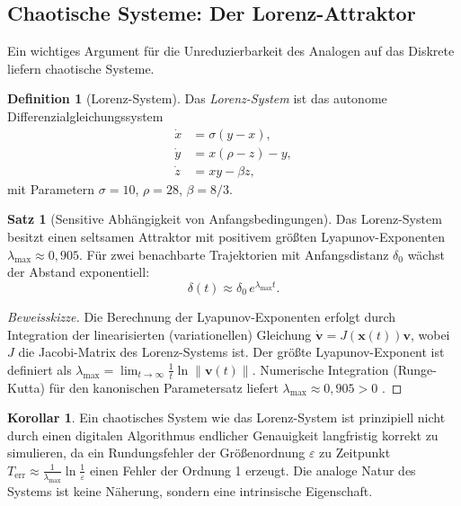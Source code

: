 ﻿\documentclass[a4paper,12pt]{article}
\theoremstyle{definition}
\newtheorem{definition}{Definition}
\newtheorem{satz}{Satz}
\newtheorem{korollar}{Korollar}
\begin{document}
\subsection{Chaotische Systeme: Der Lorenz-Attraktor}

Ein wichtiges Argument für die Unreduzierbarkeit des Analogen auf das Diskrete
liefern chaotische Systeme.

\begin{definition}[Lorenz-System]
Das \emph{Lorenz-System} ist das autonome Differenzialgleichungssystem
\begin{align*}
\dot{x} &= \sigma(y - x), \\
\dot{y} &= x(\rho - z) - y, \\
\dot{z} &= xy - \beta z,
\end{align*}
mit Parametern $\sigma = 10$, $\rho = 28$, $\beta = 8/3$.
\end{definition}

\begin{satz}[Sensitive Abhängigkeit von Anfangsbedingungen]
\label{satz:chaos}
Das Lorenz-System besitzt einen seltsamen Attraktor mit positivem größten
Lyapunov-Exponenten $\lambda_{\max} \approx 0{,}905$.  Für zwei benachbarte
Trajektorien mit Anfangsdistanz $\delta_0$ wächst der Abstand exponentiell:
\[
\delta(t) \approx \delta_0 \, e^{\lambda_{\max} t}.
\]
\end{satz}

\begin{proof}[Beweisskizze]
Die Berechnung der Lyapunov-Exponenten erfolgt durch Integration der
linearisierten (variationellen) Gleichung $\dot{\mathbf{v}} = J(\mathbf{x}(t)) \mathbf{v}$,
wobei $J$ die Jacobi-Matrix des Lorenz-Systems ist.
Der größte Lyapunov-Exponent ist definiert als
$\lambda_{\max} = \lim_{t\to\infty} \frac{1}{t} \ln \|\mathbf{v}(t)\|$.
Numerische Integration (Runge-Kutta) für den kanonischen Parametersatz
liefert $\lambda_{\max} \approx 0{,}905 > 0$ \citep{Sparrow1982}.
\end{proof}

\begin{korollar}
Ein chaotisches System wie das Lorenz-System ist prinzipiell nicht durch
einen digitalen Algorithmus endlicher Genauigkeit langfristig korrekt zu simulieren,
da ein Rundungsfehler der Größenordnung $\varepsilon$ zu Zeitpunkt $T_{\mathrm{err}} \approx \frac{1}{\lambda_{\max}} \ln \frac{1}{\varepsilon}$ einen Fehler der Ordnung 1 erzeugt.  Die analoge Natur des Systems
ist keine Näherung, sondern eine intrinsische Eigenschaft.
\end{korollar}
\end{document}

